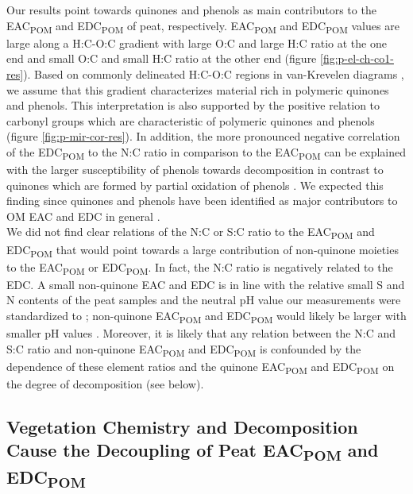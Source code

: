 \documentclass[alpha-refs, lineno]{wiley-article-rmd}
\begin{document}
Our results point towards quinones and phenols as main contributors to the EAC\textsubscript{POM} and EDC\textsubscript{POM} of peat, respectively. EAC\textsubscript{POM} and EDC\textsubscript{POM} values are large along a H:C-O:C gradient with large O:C and large H:C ratio at the one end and small O:C and small H:C ratio at the other end (figure \ref{fig:p-el-ch-co1-res}). Based on commonly delineated H:C-O:C regions in van-Krevelen diagrams \autocite{Kim.2003}, we assume that this gradient characterizes material rich in polymeric quinones and phenols. This interpretation is also supported by the positive relation to carbonyl groups which are characteristic of polymeric quinones and phenols \autocite{ElMansouri.2007} (figure \ref{fig:p-mir-cor-res}). In addition, the more pronounced negative correlation of the EDC\textsubscript{POM} to the N:C ratio in comparison to the EAC\textsubscript{POM} can be explained with the larger susceptibility of phenols towards decomposition in contrast to quinones which are formed by partial oxidation of phenols \autocite{Fenner.2011,Aeschbacher.2012,Bolton.2018}. We expected this finding since quinones and phenols have been identified as major contributors to OM EAC and EDC in general \autocite{Ratasuk.2007,Aeschbacher.2010,Aeschbacher.2012}.\\
We did not find clear relations of the N:C or S:C ratio to the EAC\textsubscript{POM} and EDC\textsubscript{POM} that would point towards a large contribution of non-quinone moieties to the EAC\textsubscript{POM} or EDC\textsubscript{POM}. In fact, the N:C ratio is negatively related to the EDC. A small non-quinone EAC and EDC is in line with the relative small S and N contents of the peat samples and the neutral pH value our measurements were standardized to \autocite{Fimmen.2007,HernandezMontoya.2012}; non-quinone EAC\textsubscript{POM} and EDC\textsubscript{POM} would likely be larger with smaller pH values \autocite{Fimmen.2007,HernandezMontoya.2012,Aeschbacher.2012}. Moreover, it is likely that any relation between the N:C and S:C ratio and non-quinone EAC\textsubscript{POM} and EDC\textsubscript{POM} is confounded by the dependence of these element ratios and the quinone EAC\textsubscript{POM} and EDC\textsubscript{POM} on the degree of decomposition \autocite{Biester.2014} (see below).

\hypertarget{vegetation-chemistry-and-decomposition-cause-the-decoupling-of-peat-eac-and-edc}{%
\subsection{\texorpdfstring{Vegetation Chemistry and Decomposition Cause the Decoupling of Peat EAC\textsubscript{POM} and EDC\textsubscript{POM}}{Vegetation Chemistry and Decomposition Cause the Decoupling of Peat EAC and EDC}}\label{vegetation-chemistry-and-decomposition-cause-the-decoupling-of-peat-eac-and-edc}}
\end{document}
